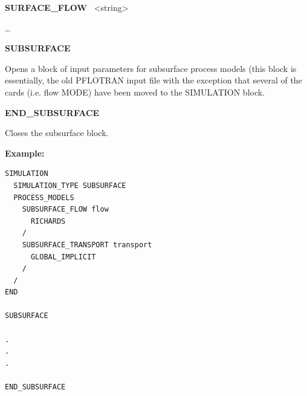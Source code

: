 \begin{description}
\begin{description}
\item {\bf SURFACE\_FLOW} \ <string>
\begin{description}
\item \ldots
\end{description}
\item \keyend
\end{description}

\item \keyend

\item {\bf SUBSURFACE}
\begin{description}
   \item Opens a block of input parameters for subsurface process models 
    (this block is essentially, the old PFLOTRAN input file with the 
    exception that several of the cards (i.e. flow MODE) have been 
    moved to the SIMULATION block.
\end{description}
\item {\bf END\_SUBSURFACE}
\begin{description}
    \item Closes the subsurface block.
    \end{description}
\end{description}

\begin{mdframed}

{\bf Example:}
\footnotesize
\begin{verbatim}
SIMULATION
  SIMULATION_TYPE SUBSURFACE
  PROCESS_MODELS
    SUBSURFACE_FLOW flow
      RICHARDS
    /
    SUBSURFACE_TRANSPORT transport
      GLOBAL_IMPLICIT
    /
  /
END

SUBSURFACE

.
.
.

END_SUBSURFACE

\end{verbatim}
\end{mdframed}
\normalsize

\newpage
